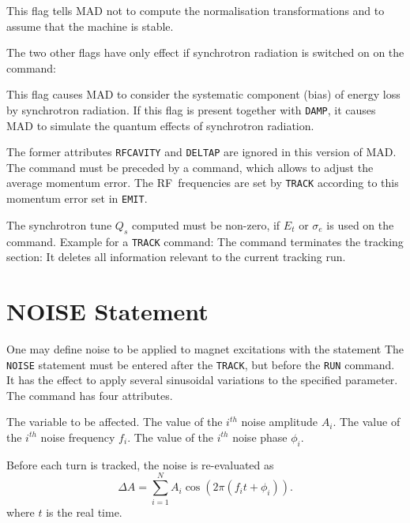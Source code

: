 \begin{mylist}
This flag tells MAD not to compute the normalisation transformations
and to assume that the machine is stable.
\end{mylist}

The two other flags have only effect if synchrotron radiation is
switched on on the  command:

\begin{mylist}
This flag causes MAD to consider the systematic component
(bias) of energy loss by synchrotron radiation.
If this flag is present together with {\tt DAMP},
it causes MAD to simulate the quantum effects of synchrotron radiation.
\end{mylist}

The former attributes {\tt RFCAVITY} and {\tt DELTAP} are ignored in
this version of MAD.
The  command must be preceded by a 
command, which allows to adjust the average momentum error.
The RF~frequencies are set by {\tt TRACK} according to this momentum
error set in {\tt EMIT}.

The synchrotron tune \(Q_{s}\) computed must be non-zero,
if \(E_{t}\) or \(\sigma_{e}\) is used on the  command.
Example for a {\tt TRACK} command:
The  command terminates the tracking section:
It deletes all information relevant to the current tracking run.
 
\section{NOISE Statement}
\label{S-NOISE}
One may define noise to be applied to magnet excitations
with the  statement
The {\tt NOISE} statement must be entered after the {\tt TRACK},
but before the {\tt RUN} command.
It has the effect to apply several sinusoidal variations to the
specified parameter.
The command has four attributes.
\begin{mylist}
The variable to be affected.
The value of the \(i^{th}\) noise amplitude \(A_i\).
The value of the \(i^{th}\) noise frequency \(f_i\).
The value of the \(i^{th}\) noise phase \(\phi_i\).
\end{mylist}
Before each turn is tracked, the noise is re-evaluated as
\[
\Delta A = \sum_{i=1}^N A_i \cos ( 2\pi (f_i t + \phi_i)).
\]
where \(t\) is the real time.
 
